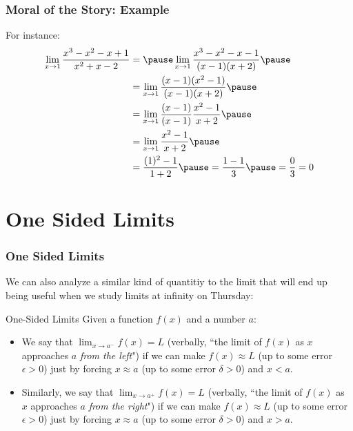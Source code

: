 \documentclass{ltx-talk}
\begin{document}
\begin{frame}
  \frametitle{Moral of the Story: Example}

  For instance:
  \begin{align}
    \lim_{x \rightarrow 1} \dfrac{x^3 - x^2 - x + 1}{x^2 + x - 2} &= \pause \lim_{x \rightarrow 1} \dfrac{x^3 - x^2 - x - 1}{(x - 1)(x + 2)} \pause \\
                                                                  &= \lim_{x \rightarrow 1} \dfrac{(x - 1)(x^2 - 1)}{(x - 1)(x+2)} \pause \\
                                                                  &= \lim_{x \rightarrow 1} \dfrac{(x-1)}{(x-1)} \dfrac{x^2 - 1}{x + 2} \pause \\
                                                                  &= \lim_{x \rightarrow 1} \dfrac{x^2 - 1}{x + 2} \pause \\
                                                                  &= \dfrac{(1)^2 - 1}{1 + 2} \pause = \dfrac{1 - 1}{3} \pause = \dfrac{0}{3} = 0
  \end{align}
\end{frame}

\section{One Sided Limits}

\begin{frame}
  \frametitle{One Sided Limits}

  We can also analyze a similar kind of quantitiy to the limit that will end up being useful when we study limits at infinity on Thursday: \pause

  \begin{block}{One-Sided Limits}
    Given a function $f(x)$ and a number $a$: \pause
    \begin{itemize}
      \item We say that $\lim_{x \rightarrow a^{-}} f(x) = L$ (verbally, ``the limit of $f(x)$ as $x$ approaches $a$ \textit{from the left}") \pause
        if we can make $f(x) \approx L$ (up to some error $\epsilon > 0$) \pause just by forcing $x \approx a$ (up to some error $\delta > 0$) \pause and $x < a$. \pause
      \item Similarly, we say that $\lim_{x \rightarrow a^{+}} f(x) = L$ (verbally, ``the limit of $f(x)$ as $x$ approaches $a$ \textit{from the right}") \pause
        if we can make $f(x) \approx L$ (up to some error $\epsilon > 0$) \pause just by forcing $x \approx a$ (up to some error $\delta > 0$) \pause and $x > a$.
    \end{itemize}
  \end{block}
\end{frame}
\end{document}
